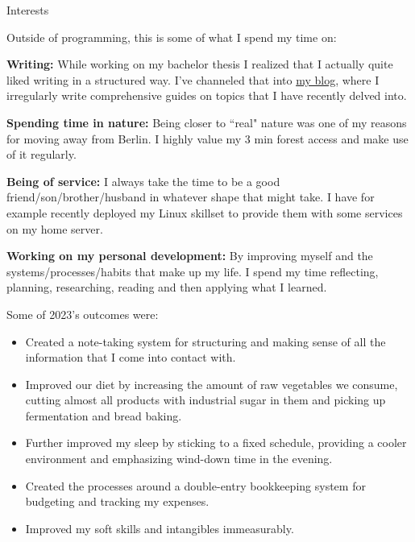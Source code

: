 \documentclass{cv}
\begin{document}
\begin{rSection}{Interests}

  Outside of programming, this is some of what I spend my time on:

  {\bf Writing:}
  While working on my bachelor thesis I realized that I actually quite liked
  writing in a structured way.
  I've channeled that into \href{https://jneidel.com/blog/}{my blog}, where I
  irregularly write comprehensive guides on topics that I have recently delved
  into.

  {\bf Spending time in nature:}
  Being closer to ``real" nature was one of my reasons for moving away from Berlin.
  I highly value my 3 min forest access and make use of it regularly.

  {\bf Being of service:}
  I always take the time to be a good friend/son/brother/husband in whatever
  shape that might take.
  I have for example recently deployed my Linux skillset to provide them with some services on my home server.

  {\bf Working on my personal development:}
  By improving myself and the systems/processes/habits that make up my life.
  I spend my time reflecting, planning, researching, reading and then applying what I
  learned.

  Some of 2023's outcomes were:
  \begin{itemize}
    \item Created a note-taking system for structuring and making sense of all the
      information that I come into contact with.
    \item Improved our diet by increasing the amount of raw vegetables we
      consume, cutting almost all products with industrial sugar in them and picking up
      fermentation and bread baking.
    \item Further improved my sleep by sticking to a fixed schedule, providing a cooler
      environment and emphasizing wind-down time in the evening.
    \item Created the processes around a double-entry bookkeeping system for budgeting and tracking my expenses.
    \item Improved my soft skills and intangibles immeasurably.
  \end{itemize}

\end{rSection}
\end{document}
